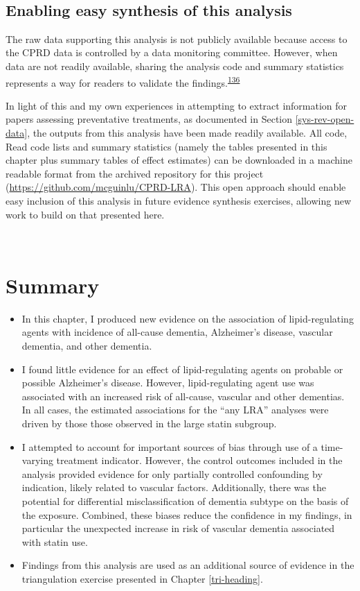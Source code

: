 \documentclass[a4paper, twoside]{templates/ociamthesis}
\begin{document}
~

\hypertarget{cprd-data-avail}{%
\subsection{Enabling easy synthesis of this analysis}\label{cprd-data-avail}}

The raw data supporting this analysis is not publicly available because access to the CPRD data is controlled by a data monitoring committee. However, when data are not readily available, sharing the analysis code and summary statistics represents a way for readers to validate the findings.\textsuperscript{\protect\hyperlink{ref-goldacre2019}{136}}

In light of this and my own experiences in attempting to extract information for papers assessing preventative treatments, as documented in Section \ref{sys-rev-open-data}, the outputs from this analysis have been made readily available. All code, Read code lists and summary statistics (namely the tables presented in this chapter plus summary tables of effect estimates) can be downloaded in a machine readable format from the archived repository for this project (\url{https://github.com/mcguinlu/CPRD-LRA}). This open approach should enable easy inclusion of this analysis in future evidence synthesis exercises, allowing new work to build on that presented here.

~

\hypertarget{summary-4}{%
\section{Summary}\label{summary-4}}

\begin{itemize}
\item
  In this chapter, I produced new evidence on the association of lipid-regulating agents with incidence of all-cause dementia, Alzheimer's disease, vascular dementia, and other dementia.
\item
  I found little evidence for an effect of lipid-regulating agents on probable or possible Alzheimer's disease. However, lipid-regulating agent use was associated with an increased risk of all-cause, vascular and other dementias. In all cases, the estimated associations for the ``any LRA'' analyses were driven by those those observed in the large statin subgroup.
\item
  I attempted to account for important sources of bias through use of a time-varying treatment indicator. However, the control outcomes included in the analysis provided evidence for only partially controlled confounding by indication, likely related to vascular factors. Additionally, there was the potential for differential misclassification of dementia subtype on the basis of the exposure. Combined, these biases reduce the confidence in my findings, in particular the unexpected increase in risk of vascular dementia associated with statin use.
\item
  Findings from this analysis are used as an additional source of evidence in the triangulation exercise presented in Chapter \ref{tri-heading}.
\end{itemize}
\end{document}
